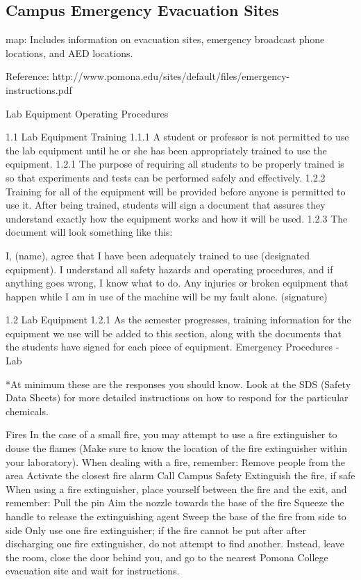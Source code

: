 \documentclass[12pt]{../SOP2}
\begin{document}
\subsection{Campus Emergency Evacuation Sites}

map: Includes information on evacuation sites, emergency broadcast phone locations, and AED locations.

		 

Reference: http://www.pomona.edu/sites/default/files/emergency-instructions.pdf 







Lab Equipment Operating Procedures

1.1	Lab Equipment Training
1.1.1  	A student or professor is not permitted to use the lab equipment until he or she has been appropriately trained to use the equipment.
1.2.1  The purpose of requiring all students to be properly trained is so that experiments and tests can be performed safely and effectively.  
1.2.2 Training for all of the equipment will be provided before anyone is permitted to use it.  After being trained, students will sign a document that assures they understand exactly how the equipment works and how it will be used.
1.2.3 The document will look something like this:

I, (name), agree that I have been adequately trained to use (designated equipment).  I understand all safety hazards and operating procedures, and if anything goes wrong, I know what to do.  Any injuries or broken equipment that happen while I am in use of the machine will be my fault alone.  
(signature)

1.2	Lab Equipment
	1.2.1 As the semester progresses, training information for the equipment we use will be added to this section, along with the documents that the students have signed for each piece of equipment.
Emergency Procedures - Lab

*At minimum these are the responses you should know. Look at the SDS (Safety Data Sheets) for more detailed instructions on how to respond for the particular chemicals.  

Fires
In the case of a small fire, you may attempt to use a fire extinguisher to douse the flames (Make sure to know the location of the fire extinguisher within your laboratory). 
When dealing with a fire, remember:
	Remove people from the area
Activate the closest fire alarm
Call Campus Safety
Extinguish the fire, if safe
When using a fire extinguisher, place yourself between the fire and the exit, and remember: 
	Pull the pin
	Aim the nozzle towards the base of the fire
	Squeeze the handle to release the extinguishing agent
	Sweep the base of the fire from side to side
Only use one fire extinguisher; if the fire cannot be put after after discharging one fire extinguisher, do not attempt to find another. Instead, leave the room, close the door behind you, and go to the nearest Pomona College evacuation site and wait for instructions.
\end{document}
